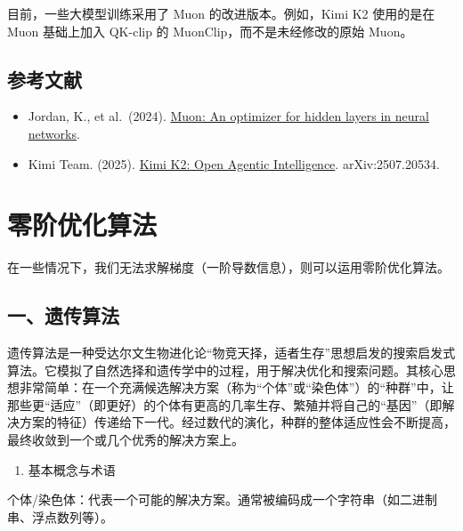 目前，一些大模型训练采用了 Muon 的改进版本。例如，Kimi K2 使用的是在 Muon 基础上加入 QK-clip 的 MuonClip，而不是未经修改的原始 Muon。

\hypertarget{ux53c2ux8003ux6587ux732e-30}{%
\subsection{参考文献}\label{ux53c2ux8003ux6587ux732e-30}}

\vspace{0.25em}
\begin{itemize}
\tightlist
\item
  Jordan, K., et al.~(2024). \href{https://kellerjordan.github.io/posts/muon/}{Muon: An optimizer for hidden layers in neural networks}.
\item
  Kimi Team. (2025). \href{https://arxiv.org/abs/2507.20534}{Kimi K2: Open Agentic Intelligence}. arXiv:2507.20534.
\end{itemize}

\clearpage

\hypertarget{ux96f6ux9636ux4f18ux5316ux7b97ux6cd5}{%
\section{零阶优化算法}\label{ux96f6ux9636ux4f18ux5316ux7b97ux6cd5}}

在一些情况下，我们无法求解梯度（一阶导数信息），则可以运用零阶优化算法。

\hypertarget{ux4e00ux9057ux4f20ux7b97ux6cd5}{%
\subsection{一、遗传算法}\label{ux4e00ux9057ux4f20ux7b97ux6cd5}}

遗传算法是一种受达尔文生物进化论``物竞天择，适者生存''思想启发的搜索启发式算法。它模拟了自然选择和遗传学中的过程，用于解决优化和搜索问题。其核心思想非常简单：在一个充满候选解决方案（称为``个体''或``染色体''）的``种群''中，让那些更``适应''（即更好）的个体有更高的几率生存、繁殖并将自己的``基因''（即解决方案的特征）传递给下一代。经过数代的演化，种群的整体适应性会不断提高，最终收敛到一个或几个优秀的解决方案上。

\begin{enumerate}
\def\labelenumi{\arabic{enumi}.}
\tightlist
\item
  基本概念与术语
\end{enumerate}

个体/染色体：代表一个可能的解决方案。通常被编码成一个字符串（如二进制串、浮点数列等）。

